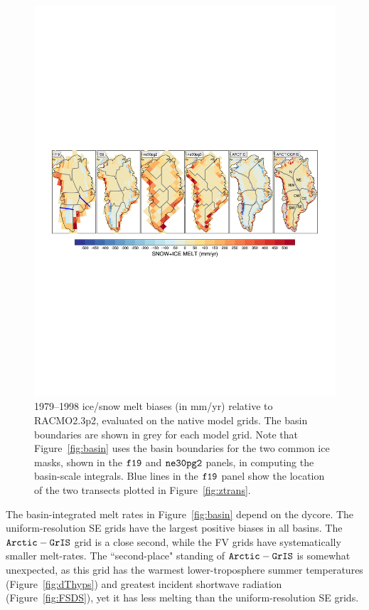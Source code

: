 \documentclass[draft]{agujournal2019}
\begin{document}
\begin{figure}[t]
\begin{center}
         \includegraphics[width=130mm]{figs/temp_contours_diffRACMO_melt.pdf}
\end{center}
\caption{1979--1998 ice/snow melt biases (in mm/yr) relative to RACMO2.3p2, evaluated on the native model grids. The  basin boundaries are shown in grey for each model grid. Note that Figure~\ref{fig:basin} uses the basin boundaries for the two common ice masks, shown in the $\tt f19$ and $\tt ne30pg2$ panels, in computing the basin-scale integrals. Blue lines in the $\tt f19$ panel show the location of the two transects plotted in Figure~\ref{fig:ztrans}.}
\label{fig:melt}
\end{figure}

The basin-integrated melt rates in Figure~\ref{fig:basin} depend on the dycore. The uniform-resolution SE grids have the largest positive biases in all basins. The $\tt Arctic-GrIS$ grid is a close second, while the FV grids have systematically smaller melt-rates. The ``second-place" standing of $\tt Arctic-GrIS$ is somewhat unexpected, as this grid has the warmest lower-troposphere summer temperatures (Figure~\ref{fig:dThyps}) and greatest incident shortwave radiation (Figure~\ref{fig:FSDS}), yet it has less melting than the uniform-resolution SE grids.
\end{document}
